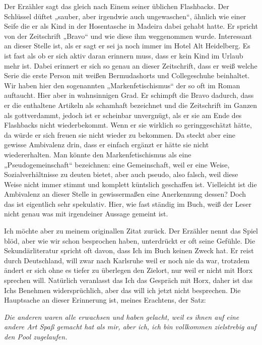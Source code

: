 \documentclass[12pt,a4paper]{article}
\begin{document}
Der Erzähler sagt das gleich nach Einem seiner üblichen Flashbacks. Der Schlüssel düftet „sauber, aber irgendwie auch ungewaschen“, ähnlich wie einer Seife die er als Kind in der Hosentasche in Madeira dabei gehabt hatte. Er spricht von der Zeitschrift „Bravo“ und wie diese ihm weggenommen wurde. Interessant an dieser Stelle ist, als er sagt er sei ja noch immer im Hotel Alt Heidelberg. Es ist fast als ob er sich aktiv daran erinnern muss, dass er kein Kind im Urlaub mehr ist. Dabei erinnert er sich so genau an dieser Zeitschrift, dass er weiß welche Serie die erste Person mit weißen Bermudashorts und Collegeschuhe beinhaltet. Wir haben hier den sogenannten „Markenfetischismus“ der so oft im Roman auftaucht. Hier aber in wahnsinnigen Grad. Er schimpft die Bravo dadurch, dass er die enthaltene Artikeln als schamhaft bezeichnet und die Zeitschrift im Ganzen als gottverdammt, jedoch ist er scheinbar unvergnügt, als er sie am Ende des Flashbacks nicht wiederbekommt. Wenn er sie wirklich so geringgeschätzt hätte, da würde er sich freuen sie nicht wieder zu bekommen. Da steckt aber eine gewisse Ambivalenz drin, dass er einfach ergänzt er hätte sie nicht wiedererhalten. Man könnte den Markenfetischismus als eine „Pseudogemeinschaft“ bezeichnen: eine Gemeinschaft, weil er eine Weise, Sozialverhältnisse zu deuten bietet, aber auch pseudo, also falsch, weil diese Weise nicht immer stimmt und komplett küntslich geschaffen ist. Vielleicht ist die Ambivalenz an dieser Stelle in gewissermaßen eine Anerkennung dessen? Doch das ist eigentlich sehr spekulativ. Hier, wie fast ständig im Buch, weiß der Leser nicht genau was mit irgendeiner Aussage gemeint ist.\par
%
Ich möchte aber zu meinem originallen Zitat zurück. Der Erzähler nennt das Spiel blöd, aber wie wir schon besprochen haben, unterdrückt er oft seine Gefühle. Die Sekundärliteratur spricht oft davon, dass Ich im Buch keinen Zweck hat. Er reist durch Deutschland, will zwar nach Karlsruhe weil er noch nie da war, trotzdem ändert er sich ohne es tiefer zu überlegen den Zielort, nur weil er nicht mit Horx sprechen will. Natürlich veranlasst das Ich das Gespräch mit Horx, daher ist das Ichs Benehmen widersprüchlich, aber das will ich jetzt nicht besprechen. Die Hauptsache an dieser Erinnerung ist, meines Erachtens, der Satz:\\%
\vspace{-2.5em}
\begin{center}
    \textit{Die anderen waren alle erwachsen und haben gelacht, weil es ihnen auf eine andere Art Spaß gemacht hat als mir, aber ich, ich bin vollkommen zielstrebig auf den Pool zugelaufen.}\\%
\end{center}
\end{document}
